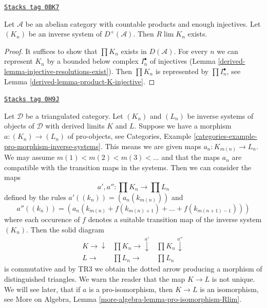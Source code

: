 \begin{lemma}
\label{derived-lemma-inverse-limit-bounded-below}
\href{https://stacks.math.columbia.edu/tag/0BK7}{\texttt{Stacks tag 0BK7}}

Let $\mathcal{A}$ be an abelian category with countable products and
enough injectives. Let $(K_n)$ be an inverse system of $D^+(\mathcal{A})$.
Then $R\lim K_n$ exists.
\end{lemma}

\begin{proof}

It suffices to show that $\prod K_n$ exists in $D(\mathcal{A})$.
For every $n$ we can represent $K_n$ by a bounded below complex
$I_n^\bullet$ of injectives (Lemma \ref{derived-lemma-injective-resolutions-exist}).
Then $\prod K_n$ is represented by $\prod I_n^\bullet$, see
Lemma \ref{derived-lemma-product-K-injective}.
\end{proof}

\begin{remark}
\label{derived-remark-functoriality-derived-limit}
\href{https://stacks.math.columbia.edu/tag/0H9J}{\texttt{Stacks tag 0H9J}}

Let $\mathcal{D}$ be a triangulated category. Let $(K_n)$ and $(L_n)$ be
inverse systems of objects of $\mathcal{D}$ with derived limits $K$ and $L$.
Suppose we have a morphism $a : (K_n) \to (L_n)$ of pro-objects, see
Categories, Example \ref{categories-example-pro-morphism-inverse-systems}.
This means we are given maps $a_n : K_{m(n)} \to L_n$. We may assume
$m(1) < m(2) < m(3) < \ldots$ and that the maps $a_n$ are compatible
with the transition maps in the systems. Then we can consider the maps
$$
a', a'' : \prod K_n \longrightarrow \prod L_n
$$
defined by the rules $a'((k_n)) = (a_n(k_{m(n)}))$ and
$$
a''((k_n)) =
(a_n(k_{m(n)} + f(k_{m(n) + 1}) + \ldots + f(k_{m(n + 1) - 1})))
$$
where each occurence of $f$ denotes a suitable transition map of
the inverse system $(K_n)$. Then the solid diagram
$$
\begin{array}{ccc}K \longrightarrow\downarrow & \prod K_n \longrightarrow\overset{a'}{\downarrow} & \prod K_n \overset{a''}{\downarrow} \\ L \longrightarrow & \prod L_n \longrightarrow & \prod L_n\end{array}
$$
is commutative and by TR3 we obtain the dotted arrow producing
a morphism of distinguished triangles. We warn the reader that
the map $K \to L$ is not unique. We will see later, that if $a$
is a pro-isomorphism, then $K \to L$ is an isomorphism, see
More on Algebra, Lemma \ref{more-algebra-lemma-pro-isomorphism-Rlim}.
\end{remark}

